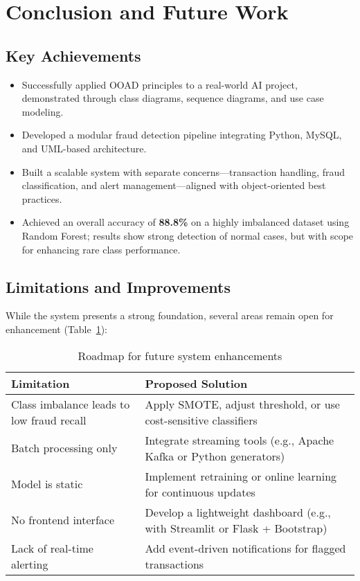 \documentclass[12pt]{article}
\begin{document}
\section{Conclusion and Future Work}

\subsection{Key Achievements}
\begin{itemize}[leftmargin=*]
    \item Successfully applied OOAD principles to a real-world AI project, demonstrated through class diagrams, sequence diagrams, and use case modeling.
    \item Developed a modular fraud detection pipeline integrating Python, MySQL, and UML-based architecture.
    \item Built a scalable system with separate concerns—transaction handling, fraud classification, and alert management—aligned with object-oriented best practices.
    \item Achieved an overall accuracy of \textbf{88.8\%} on a highly imbalanced dataset using Random Forest; results show strong detection of normal cases, but with scope for enhancing rare class performance.
\end{itemize}

\subsection{Limitations and Improvements}
While the system presents a strong foundation, several areas remain open for enhancement (Table~\ref{tab:roadmap}):

\begin{table}[h!]
\centering
\begin{tabular}{@{}lp{}@{}}
\toprule
\textbf{Limitation} & \textbf{Proposed Solution} \\ \midrule
Class imbalance leads to low fraud recall & Apply SMOTE, adjust threshold, or use cost-sensitive classifiers \\
Batch processing only & Integrate streaming tools (e.g., Apache Kafka or Python generators) \\
Model is static & Implement retraining or online learning for continuous updates \\
No frontend interface & Develop a lightweight dashboard (e.g., with Streamlit or Flask + Bootstrap) \\
Lack of real-time alerting & Add event-driven notifications for flagged transactions \\
\bottomrule
\end{tabular}
\caption{Roadmap for future system enhancements}
\label{tab:roadmap}
\end{table}
\end{document}
